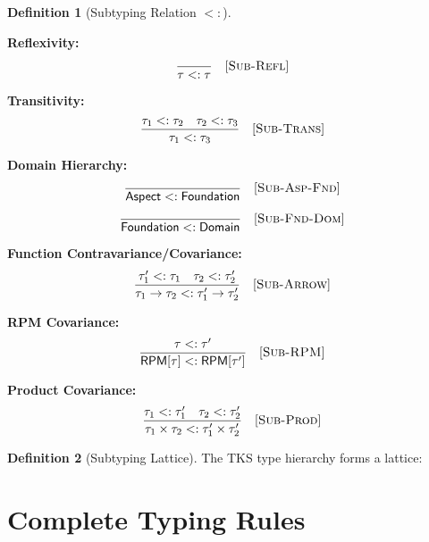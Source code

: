 \documentclass[11pt,twoside,openright]{book}
\theoremstyle{definition}
\newtheorem{definition}{Definition}[chapter]
\theoremstyle{plain}
\theoremstyle{remark}
\newcommand{\subtype}{<:}
\begin{document}
\begin{definition}[Subtyping Relation $\subtype$]
\label{def:subtyping}

\textbf{Reflexivity:}
\[
\frac{}{\tau \subtype \tau} \quad [\textsc{Sub-Refl}]
\]

\textbf{Transitivity:}
\[
\frac{\tau_1 \subtype \tau_2 \quad \tau_2 \subtype \tau_3}{\tau_1 \subtype \tau_3} \quad [\textsc{Sub-Trans}]
\]

\textbf{Domain Hierarchy:}
\[
\frac{}{\mathsf{Aspect} \subtype \mathsf{Foundation}} \quad [\textsc{Sub-Asp-Fnd}]
\]
\[
\frac{}{\mathsf{Foundation} \subtype \mathsf{Domain}} \quad [\textsc{Sub-Fnd-Dom}]
\]

\textbf{Function Contravariance/Covariance:}
\[
\frac{\tau_1' \subtype \tau_1 \quad \tau_2 \subtype \tau_2'}{\tau_1 \to \tau_2 \subtype \tau_1' \to \tau_2'} \quad [\textsc{Sub-Arrow}]
\]

\textbf{RPM Covariance:}
\[
\frac{\tau \subtype \tau'}{\mathsf{RPM}[\tau] \subtype \mathsf{RPM}[\tau']} \quad [\textsc{Sub-RPM}]
\]

\textbf{Product Covariance:}
\[
\frac{\tau_1 \subtype \tau_1' \quad \tau_2 \subtype \tau_2'}{\tau_1 \times \tau_2 \subtype \tau_1' \times \tau_2'} \quad [\textsc{Sub-Prod}]
\]
\end{definition}

\begin{definition}[Subtyping Lattice]
\label{def:subtype-lattice}
The TKS type hierarchy forms a lattice:
\begin{center}
\end{center}
\end{definition}

\section{Complete Typing Rules}
\end{document}
